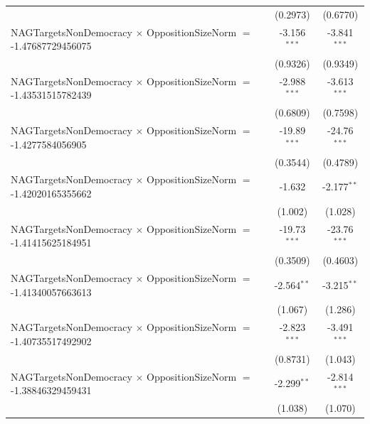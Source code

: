 \begin{tabular}{lcc}
                                                                                & (0.2973)             & (0.6770)\\   
   NAGTargetsNonDemocracy $\times$ OppositionSizeNorm $=$ -1.47687729456075     & -3.156$^{***}$       & -3.841$^{***}$\\   
                                                                                & (0.9326)             & (0.9349)\\   
   NAGTargetsNonDemocracy $\times$ OppositionSizeNorm $=$ -1.43531515782439     & -2.988$^{***}$       & -3.613$^{***}$\\   
                                                                                & (0.6809)             & (0.7598)\\   
   NAGTargetsNonDemocracy $\times$ OppositionSizeNorm $=$ -1.4277584056905      & -19.89$^{***}$       & -24.76$^{***}$\\   
                                                                                & (0.3544)             & (0.4789)\\   
   NAGTargetsNonDemocracy $\times$ OppositionSizeNorm $=$ -1.42020165355662     & -1.632               & -2.177$^{**}$\\   
                                                                                & (1.002)              & (1.028)\\   
   NAGTargetsNonDemocracy $\times$ OppositionSizeNorm $=$ -1.41415625184951     & -19.73$^{***}$       & -23.76$^{***}$\\   
                                                                                & (0.3509)             & (0.4603)\\   
   NAGTargetsNonDemocracy $\times$ OppositionSizeNorm $=$ -1.41340057663613     & -2.564$^{**}$        & -3.215$^{**}$\\   
                                                                                & (1.067)              & (1.286)\\   
   NAGTargetsNonDemocracy $\times$ OppositionSizeNorm $=$ -1.40735517492902     & -2.823$^{***}$       & -3.491$^{***}$\\   
                                                                                & (0.8731)             & (1.043)\\   
   NAGTargetsNonDemocracy $\times$ OppositionSizeNorm $=$ -1.38846329459431     & -2.299$^{**}$        & -2.814$^{***}$\\   
                                                                                & (1.038)              & (1.070)\\   

\end{tabular}
